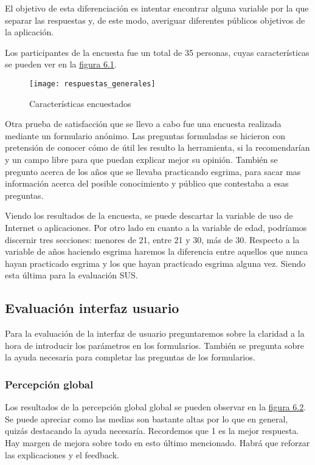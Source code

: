 El objetivo de esta diferenciación es intentar encontrar alguna variable por la que separar
las respuestas y, de este modo, averiguar diferentes públicos objetivos de la aplicación.

Los participantes de la encuesta fue un total de 35 personas, cuyas características se pueden ver en la \hyperref[fig:Características encuestados]{figura 6.1}.

\begin{figure}[htb]
	\centering
	\texttt{[image: respuestas\_generales]}
	\caption[Características encuestados]{Características encuestados}
	\label{fig:Características encuestados}
\end{figure}

Otra prueba de satisfacción que se llevo a cabo fue una encuesta realizada mediante un formulario
anónimo. Las preguntas formuladas se hicieron con pretensión de conocer cómo de útil les resulto
la herramienta, si la recomendarían y un campo libre para que puedan explicar mejor su opinión.
También se pregunto acerca de los años que se llevaba practicando esgrima, para sacar mas información
acerca del posible conocimiento y público que contestaba a esas preguntas.



Viendo los resultados de la encuesta, se puede descartar la variable de uso de Internet o aplicaciones.
Por otro lado en cuanto a la variable de edad, podríamos discernir tres secciones: menores de 21, entre 21
y 30, más de 30. Respecto a la variable de años haciendo esgrima haremos la diferencia entre aquellos
que nunca hayan practicado esgrima y los que hayan practicado esgrima alguna vez. Siendo esta última
para la evaluación SUS.

\subsection{Evaluación interfaz usuario}

Para la evaluación de la interfaz de usuario preguntaremos sobre la claridad a la hora de introducir
los parámetros en los formularios. También se pregunta sobre la ayuda necesaria para completar las preguntas de los formularios.

\subsubsection{Percepción global}

Los resultados de la percepción global global se pueden observar en la \hyperref[fig:Percepción global de interfaz]{figura 6.2}. Se puede apreciar
como las medias son bastante altas por lo que en general, quizás destacando la ayuda necesaría.
Recordemos que 1 es la mejor respuesta. Hay margen de mejora sobre todo en esto último mencionado.
Habrá que reforzar las explicaciones y el feedback.

